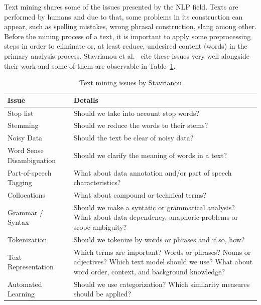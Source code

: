 Text mining shares some of the issues presented by the \gls{NLP} field. Texts are performed by humans and due to that, some problems in its construction can appear, such as spelling mistakes, wrong phrasal construction, slang among other. Before the mining process of a text, it is important to apply some preprocessing steps in order to eliminate or, at least reduce, undesired content (words) in the primary analysis process.
Stavrianou et al.~\cite{stavrianou2007overview} cite these issues very well alongside their work and some of them are observable in Table~\ref{table:textminingissues}.

\begin{table}[htbp]
	\centering
	\caption{Text mining issues by Stavrianou \cite{stavrianou2007overview}}
	\label{table:textminingissues}
	\begin{tabular}{ | l | p{7cm} |}
		\hline \textbf{Issue}            & \textbf{Details}\\
		\hline Stop list                 & Should we take into account stop words?\\ 
		\hline Stemming                  & Should we reduce the words to their stems?\\ 
		\hline Noisy Data                & Should the text be clear of noisy data?\\ 
		\hline Word Sense Disambiguation & Should we clarify the meaning of words in a text?\\ 
		\hline Part-of-speech Tagging    & What about data annotation and/or part of speech characteristics?\\ 
		\hline Collocations              & What about compound or technical terms?\\ 
		\hline Grammar / Syntax          & Should we make a syntatic or grammatical analysis? What about data dependency, anaphoric problems or scope ambiguity?\\ 
		\hline Tokenization              & Should we tokenize by words or phrases and if so, how?\\ 
		\hline Text Representation       & Which terms are important? Words or phrases? Nouns or adjectives? Which text model should we use? What about word order, context, and background knowledge? \\ 
		\hline Automated Learning        & Should we use categorization? Which similarity measures should be applied? \\ \hline
	\end{tabular}
\end{table}

